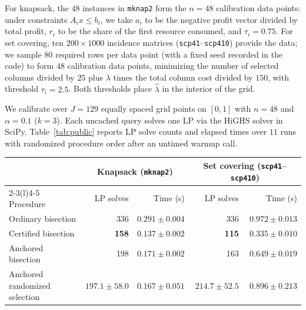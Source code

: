 \documentclass[a4paper,10pt]{article}
\theoremstyle{plain}
\theoremstyle{remark}
\begin{document}
For knapsack, the $48$ instances in \texttt{mknap2} form the $n=48$ calibration data points: under constraints $A_i x\le b_i$, we take $a_i$ to be the negative profit vector divided by total profit, $r_i$ to be the share of the first resource consumed, and $\tau_i=0.75$. For set covering, ten $200\times 1000$ incidence matrices (\texttt{scp41}--\texttt{scp410}) provide the data; we sample $80$ required rows per data point (with a fixed seed recorded in the code) to form $48$ calibration data points, minimizing the number of selected columns divided by $25$ plus $\lambda$ times the total column cost divided by $150$, with threshold $\tau_i=2.5$. Both thresholds place $\widehat\lambda$ in the interior of the grid.

We calibrate over $J=129$ equally spaced grid points on $[0,1]$ with $n=48$ and $\alpha=0.1$ ($k=3$). Each uncached query solves one LP via the HiGHS solver in SciPy. Table~\ref{tab:public} reports LP solve counts and elapsed times over $11$ runs with randomized procedure order after an untimed warmup call.

\vspace{4pt}
\noindent\begin{minipage}{\linewidth}
\label{tab:public}
\vspace{2pt}
\centering\small
\begin{tabular}{@{}lrrrr@{}}
\toprule
& \multicolumn{2}{c}{Knapsack (\texttt{mknap2})} & \multicolumn{2}{c}{Set covering (\texttt{scp41}--\texttt{scp410})} \\
\cmidrule(lr){2-3}\cmidrule(l){4-5}
Procedure & LP solves & Time (s) & LP solves & Time (s) \\
\midrule
Ordinary bisection & 336 & $0.291\pm0.004$ & 336 & $0.972\pm0.013$ \\
Certified bisection & \textbf{158} & $\mathbf{0.137\pm0.002}$ & \textbf{115} & $\mathbf{0.335\pm0.010}$ \\
Anchored bisection & 198 & $0.171\pm0.002$ & 163 & $0.649\pm0.019$ \\
Anchored randomized selection & $197.1\pm58.0$ & $0.167\pm0.051$ & $214.7\pm52.5$ & $0.896\pm0.213$ \\
\bottomrule
\end{tabular}
\end{minipage}
\vspace{4pt}
\end{document}
